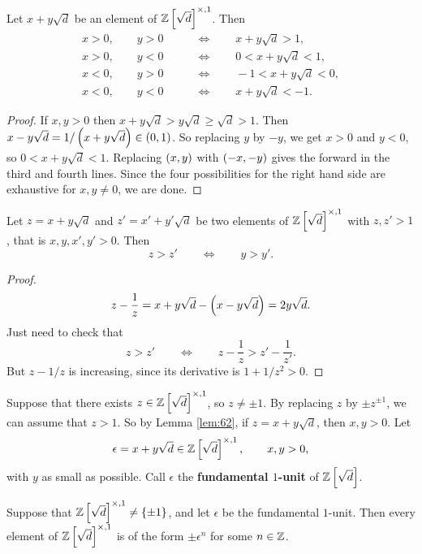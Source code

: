 \begin{lemma}
\label{lem:62}
Let $ x + y\sqrt{d} $ be an element of $ \Z\sbr{\sqrt{d}}^{\times, 1} $. Then
\begin{align*}
x > 0, \qquad y > 0 \qquad & \iff \qquad x + y\sqrt{d} > 1, \\
x > 0, \qquad y < 0 \qquad & \iff \qquad 0 < x + y\sqrt{d} < 1, \\
x < 0, \qquad y > 0 \qquad & \iff \qquad -1 < x + y\sqrt{d} < 0, \\
x < 0, \qquad y < 0 \qquad & \iff \qquad x + y\sqrt{d} < -1.
\end{align*}
\end{lemma}

\begin{proof}
If $ x, y > 0 $ then $ x + y\sqrt{d} > y\sqrt{d} \ge \sqrt{d} > 1 $. Then $ x - y\sqrt{d} = 1 / \br{x + y\sqrt{d}} \in \br{0, 1} $. So replacing $ y $ by $ -y $, we get $ x > 0 $ and $ y < 0 $, so $ 0 < x + y\sqrt{d} < 1 $. Replacing $ \br{x, y} $ with $ \br{-x, -y} $ gives the forward in the third and fourth lines. Since the four possibilities for the right hand side are exhaustive for $ x, y \ne 0 $, we are done.
\end{proof}

\begin{lemma}
\label{lem:63}
Let $ z = x + y\sqrt{d} $ and $ z' = x' + y'\sqrt{d} $ be two elements of $ \Z\sbr{\sqrt{d}}^{\times, 1} $ with $ z, z' > 1 $, that is $ x, y, x', y' > 0 $. Then
$$ z > z' \qquad \iff \qquad y > y'. $$
\end{lemma}

\begin{proof}
$$ z - \dfrac{1}{z} = x + y\sqrt{d} - \br{x - y\sqrt{d}} = 2y\sqrt{d}. $$
Just need to check that
$$ z > z' \qquad \iff \qquad z - \dfrac{1}{z} > z' - \dfrac{1}{z'}. $$
But $ z - 1 / z $ is increasing, since its derivative is $ 1 + 1 / z^2 > 0 $.
\end{proof}


Suppose that there exists $ z \in \Z\sbr{\sqrt{d}}^{\times, 1} $, so $ z \ne \pm 1 $. By replacing $ z $ by $ \pm z^{\pm 1} $, we can assume that $ z > 1 $. So by Lemma \ref{lem:62}, if $ z = x + y\sqrt{d} $, then $ x, y > 0 $. Let
$$ \epsilon = x + y\sqrt{d} \in \Z\sbr{\sqrt{d}}^{\times, 1}, \qquad x, y > 0, $$
with $ y $ as small as possible. Call $ \epsilon $ the \textbf{fundamental $ 1 $-unit} of $ \Z\sbr{\sqrt{d}} $.

\begin{proposition}
Suppose that $ \Z\sbr{\sqrt{d}}^{\times, 1} \ne \cbr{\pm 1} $, and let $ \epsilon $ be the fundamental $ 1 $-unit. Then every element of $ \Z\sbr{\sqrt{d}}^{\times, 1} $ is of the form $ \pm \epsilon^n $ for some $ n \in \mathbb{Z} $.
\end{proposition}

